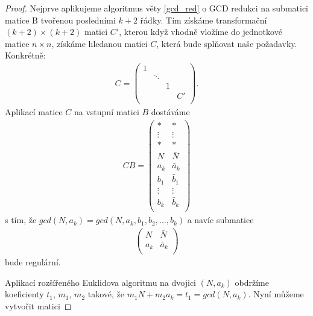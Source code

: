 \begin{proof}
Nejprve aplikujeme algoritmus věty \ref{gcd_red} o GCD redukci na submatici
matice B tvořenou posledními $ k + 2 $ řádky. Tím získáme transformační
$ (k + 2) \times (k + 2) $ matici $ C' $, kterou když vhodně vložíme do jednotkové
matice $ n \times n $, získáme hledanou matici $ C $, která bude splňovat naše
požadavky. Konkrétně:
\begin{align*}
C =
    \begin{pmatrix}
        1 &        &   &    \\
          & \ddots &   &    \\
          &        & 1 &    \\
          &        &   & C' \\
    \end{pmatrix}
.
\end{align*}
Aplikací matice $ C $ na vstupní matici $ B $ dostáváme
\begin{align*}
CB =
    \begin{pmatrix}
        \ast   & \ast   \\
        \vdots & \vdots \\
        \ast   & \ast   \\
        N      & \bar{N} \\
        a_k    & \bar{a}_k  \\
        b_1    & \bar{b}_1  \\
        \vdots & \vdots  \\
        b_k    & \bar{b}_k  \\
    \end{pmatrix}
\end{align*}
s tím, že $ gcd(N, a_k) = gcd(N, a_k, b_1, b_2, \dots, b_k) $ a navíc submatice
\begin{align*}
    \begin{pmatrix}
        N      & \bar{N} \\
        a_k    & \bar{a}_k  \\
    \end{pmatrix}
\end{align*}
bude regulární.

Aplikací rozšířeného Euklidova algoritmu na dvojici $ (N, a_k) $ obdržíme
koeficienty $ t_1 $, $ m_1 $, $ m_2 $ takové, že
$ m_1 N + m_2 a_k = t_1 = gcd(N, a_k) $. Nyní můžeme vytvořit matici


\end{proof}
